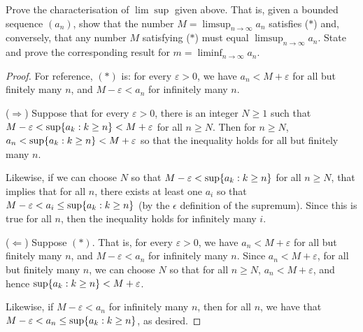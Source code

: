 \begin{exercise}{26}
Prove the characterisation of $\lim\sup$ given above. That is, given a bounded sequence $(a_n)$, show that the number $M=\limsup_{n\to\infty}a_n$ satisfies ($\ast$) and, conversely, that any number $M$ satisfying ($\ast$) must equal $\limsup_{n\to\infty}a_n$. State and prove the corresponding result for $m=\liminf_{n\to\infty}a_n$.
\end{exercise}
\begin{proof}
For reference, $(\ast)$ is: for every $\varepsilon>0$, we have $a_n<M+\varepsilon$ for all but finitely many $n$, and $M-\varepsilon<a_n$ for infinitely many $n$.

($\Rightarrow$) Suppose that for every $\varepsilon>0$, there is an integer $N\geq 1$ such that $M-\varepsilon<\sup\{a_k:k\geq n\}<M+\varepsilon$ for all $n\geq N$. Then for $n\geq N$, $a_n<\sup\{a_k:k\geq n\}<M+\varepsilon$ so that the inequality holds for all but finitely many $n$. 

Likewise, if we can choose $N$ so that $M-\varepsilon<\sup\{a_k:k\geq n\}$ for all $n\geq N$, that implies that for all $n$, there exists at least one $a_i$ so that $M-\varepsilon<a_i\leq\sup\{a_k:k\geq n\}$ (by the $\epsilon$ definition of the supremum). Since this is true for all $n$, then the inequality holds for infinitely many $i$.

($\Leftarrow$) Suppose $(\ast)$. That is, for every $\varepsilon>0$, we have $a_n<M+\varepsilon$ for all but finitely many $n$, and $M-\varepsilon<a_n$ for infinitely many $n$. Since $a_n<M+\varepsilon$, for all but finitely many $n$, we can choose $N$ so that for all $n\geq N$, $a_n<M+\varepsilon$, and hence $\sup\{a_k:k\geq n\}<M+\varepsilon$. 

Likewise, if $M-\varepsilon<a_n$ for infinitely many $n$, then for all $n$, we have that $M-\varepsilon<a_n\leq\sup\{a_k:k\geq n\}$, as desired.
\end{proof}

